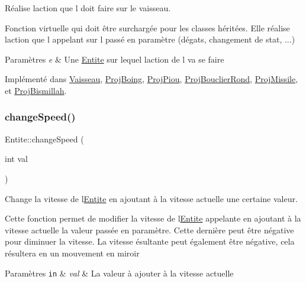 Réalise l\textquotesingle{}action que l doit faire sur le vaisseau. 

Fonction virtuelle qui doit être surchargée pour les classes héritées. Elle réalise l\textquotesingle{}action que l appelant sur l passé en paramètre (dégats, changement de stat, ...) 
\begin{DoxyParams}{Paramètres}
{\em e} & Une {\ttfamily \hyperlink{class_entite}{Entite}} sur lequel l\textquotesingle{}action de l va se faire \\
\hline
\end{DoxyParams}


Implémenté dans \hyperlink{class_vaisseau_a0cd6733845f221c2a5a9d7ccd7f43137}{Vaisseau}, \hyperlink{class_proj_boing_acbee1a0aa00582682ce755e1b19d687a}{Proj\+Boing}, \hyperlink{class_proj_piou_afd492e686378a86e10136061af035a9f}{Proj\+Piou}, \hyperlink{class_proj_bouclier_rond_a60547ae68c6862f6e4c8b9cdd94bb52b}{Proj\+Bouclier\+Rond}, \hyperlink{class_proj_missile_a8125c442857f7a0fc2d0ff442c39aca7}{Proj\+Missile}, et \hyperlink{class_proj_bismillah_a23bdc7268920f71d218198ae26021a4f}{Proj\+Bismillah}.

\mbox{\label{class_entite_abd20483e4d51bc7ebb0eb58bb4366757}} 
\subsubsection{\texorpdfstring{change\+Speed()}{changeSpeed()}}
{\footnotesize\ttfamily Entite\+::change\+Speed (\begin{DoxyParamCaption}\item[{int}]{val }\end{DoxyParamCaption})}



Change la vitesse de l\textquotesingle{}\hyperlink{class_entite}{Entite} en ajoutant à la vitesse actuelle une certaine valeur. 

Cette fonction permet de modifier la vitesse de l\textquotesingle{}\hyperlink{class_entite}{Entite} appelante en ajoutant à la vitesse actuelle la valeur passée en paramètre. Cette dernière peut être négative pour diminuer la vitesse. La vitesse ésultante peut également être négative, cela résultera en un mouvement en miroir 
\begin{DoxyParams}[1]{Paramètres}
\mbox{\tt in}  & {\em val} & La valeur à ajouter à la vitesse actuelle \\
\hline
\end{DoxyParams}
\mbox{\label{class_entite_af5c424f69b2c880ae9c12786abd28592}} 
